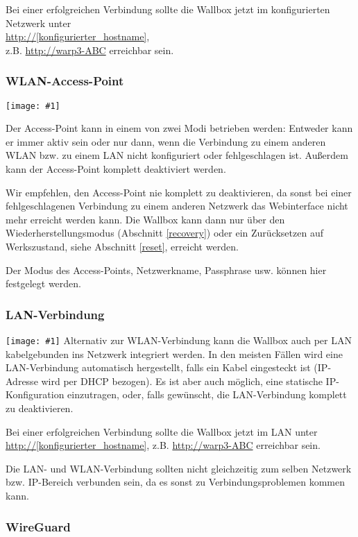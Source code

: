 \documentclass[a4paper,10pt]{article}
\newcommand{\hint}[1]{\begin{tcolorbox}[colback=boxgray,colframe=black,coltext=
white,title=Hinweis,left*=2mm,right*=2mm,boxsep=1mm,bottom=1mm,top=1mm]#1\end{tcolorbox}}
\newcommand{\gfx}[1]{\texttt{[image: \#1]}}
\begin{document}
\begin{multicols*}{2}
    Bei einer erfolgreichen Verbindung sollte die Wallbox jetzt im konfigurierten Netzwerk unter\\
    \url{http://[konfigurierter_hostname]},\\ z.B. \url{http://warp3-ABC} erreichbar sein.

    \subsubsection{WLAN-Access-Point}
    \gfx{./img_warp3/resized/web_wifi_ap}

    Der Access-Point kann in einem von zwei Modi betrieben werden: Entweder kann er immer aktiv sein
    oder nur dann, wenn die Verbindung zu einem anderen WLAN bzw. zu einem LAN nicht konfiguriert oder fehlgeschlagen ist.
    Außerdem kann der Access-Point komplett deaktiviert werden.
    \hint{Wir empfehlen, den Access-Point nie komplett zu deaktivieren, da sonst bei einer
        fehlgeschlagenen Verbindung zu einem anderen Netzwerk das Webinterface nicht mehr erreicht
        werden kann. Die Wallbox kann dann nur über den Wiederherstellungsmodus
        (Abschnitt \ref{recovery}) oder ein Zurücksetzen auf Werkszustand, siehe Abschnitt \ref{reset}, erreicht werden.}

    Der Modus des Access-Points, Netzwerkname, Passphrase usw. können hier festgelegt werden.

    \subsubsection{LAN-Verbindung}
    \gfx{./img_warp3/resized/web_ethernet}
    Alternativ zur WLAN-Verbindung kann die Wallbox auch per LAN kabelgebunden
    ins Netzwerk integriert werden. In den meisten Fällen wird eine
    LAN-Verbindung automatisch hergestellt, falls ein Kabel eingesteckt ist
    (IP-Adresse wird per DHCP bezogen). Es ist aber auch möglich,
    eine statische IP-Konfiguration einzutragen, oder, falls gewünscht, die LAN-Verbindung
    komplett zu deaktivieren.

    Bei einer erfolgreichen Verbindung sollte die Wallbox jetzt im LAN unter
    \url{http://[konfigurierter_hostname]}, z.B. \url{http://warp3-ABC} erreichbar sein.

    \hint{Die LAN- und WLAN-Verbindung sollten nicht gleichzeitig zum selben Netzwerk bzw. IP-Bereich verbunden sein,
    da es sonst zu Verbindungsproblemen kommen kann.}

    \subsubsection{WireGuard}


\end{multicols*}
\end{document}
